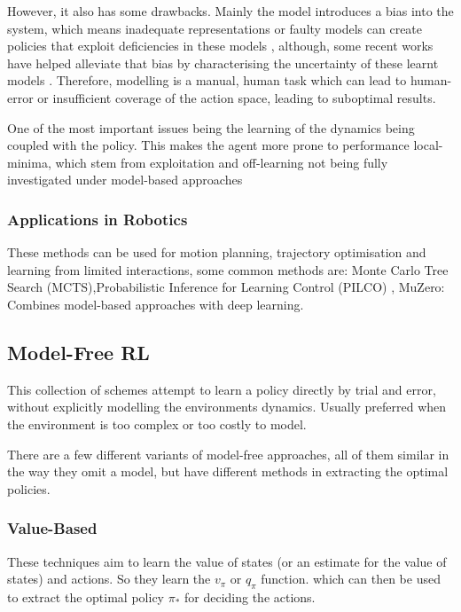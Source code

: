   However, it also has some drawbacks. Mainly the model introduces a bias into the system, which means inadequate representations or faulty models can create policies that exploit deficiencies in these models \cite{Deisenroth2011PILCO,wang2019benchmarkingmodelbasedreinforcementlearning}, although, some recent works have helped alleviate that bias by characterising the uncertainty of these learnt models \cite{kurutach2018modelensembletrustregionpolicyoptimization,chua2018deepreinforcementlearninghandful,clavera2018modelbasedreinforcementlearningmetapolicy}. Therefore, modelling is a manual, human task which can lead to human-error or insufficient coverage of the action space, leading to suboptimal results.

  One of the most important issues being the learning of the dynamics being coupled with the policy. This makes the agent more prone to performance local-minima, which stem from exploitation and off-learning not being fully investigated under model-based approaches 

  \subsubsection{Applications in Robotics}
  These methods can be used for motion planning, trajectory optimisation and learning from limited interactions, some common methods are: Monte Carlo Tree Search (MCTS),Probabilistic Inference for Learning Control (PILCO) \cite{Deisenroth2011PILCO}, MuZero: Combines model-based approaches with deep learning.
  
  \subsection{Model-Free RL}
  This collection of schemes attempt to learn a policy directly by trial and error, without explicitly modelling the environments dynamics. Usually preferred when the environment is too complex or too costly to model.

  There are a few different variants of model-free approaches, all of them similar in the way they omit a model, but have different methods in extracting the optimal policies.
  

  \subsubsection{Value-Based}
    These techniques aim to learn the value of states (or an estimate for the value of states) and actions. So they learn the $v_\pi$ or $q_\pi$ function. which can then be used to extract the optimal policy $\pi_*$ for deciding the actions.

